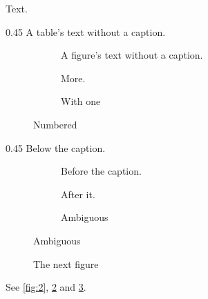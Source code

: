 \documentclass{article}
\begin{document}
Text.
\begin{table}[h]
\centering
\begin{subtable}{0.45\linewidth}
A table's text without a caption.
\end{subtable}
\caption*{Unnumbered}
\end{table}
\begin{figure}[h]
\begin{subfigure}{0.45\linewidth}
A figure's text without a caption.
\end{subfigure}
\begin{subfigure}{0.45\linewidth}
More.
\caption{With one}
\end{subfigure}
\caption{Numbered}
\end{figure}
\begin{table}[h]
\caption{The second table}
\begin{subtable}{0.45\linewidth}
Below the caption.
\end{subtable}
\end{table}
\begin{figure}[h]
\begin{subfigure}{0.45\linewidth}
Before the caption.
\end{subfigure}
\caption{The second figure}
\label{fig:2}
\begin{subfigure}{0.45\linewidth}
After it.
\caption{Ambiguous}
\label{fig:2a}
\end{subfigure}
\end{figure}
\begin{figure}[h]
\caption{The next figure}
\label{fig:3}
\end{figure}
See \ref{fig:2}, \ref{fig:2a} and \ref{fig:3}.
\end{document}
